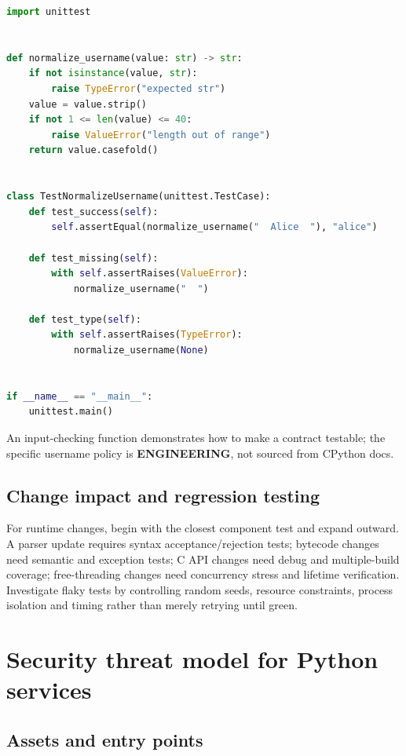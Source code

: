 \documentclass[
  11pt,
]{report}
\begin{document}
\begin{lstlisting}[language=Python]
import unittest


def normalize_username(value: str) -> str:
    if not isinstance(value, str):
        raise TypeError("expected str")
    value = value.strip()
    if not 1 <= len(value) <= 40:
        raise ValueError("length out of range")
    return value.casefold()


class TestNormalizeUsername(unittest.TestCase):
    def test_success(self):
        self.assertEqual(normalize_username("  Alice  "), "alice")

    def test_missing(self):
        with self.assertRaises(ValueError):
            normalize_username("  ")

    def test_type(self):
        with self.assertRaises(TypeError):
            normalize_username(None)


if __name__ == "__main__":
    unittest.main()
\end{lstlisting}

An input-checking function demonstrates how to make a contract testable;
the specific username policy is \textbf{ENGINEERING}, not sourced from
CPython docs.

\section{Change impact and regression
testing}\label{change-impact-and-regression-testing}

For runtime changes, begin with the closest component test and expand
outward. A parser update requires syntax acceptance/rejection tests;
bytecode changes need semantic and exception tests; C API changes need
debug and multiple-build coverage; free-threading changes need
concurrency stress and lifetime verification. Investigate flaky tests by
controlling random seeds, resource constraints, process isolation and
timing rather than merely retrying until green.

\chapter{Security threat model for Python
services}\label{security-threat-model-for-python-services}

\section{Assets and entry points}\label{assets-and-entry-points}
\end{document}
